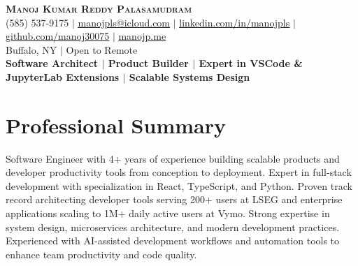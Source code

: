 \documentclass[a4paper,11pt]{article}
\begin{document}
\begin{center}
    \textbf{\Huge \scshape Manoj Kumar Reddy Palasamudram} \\ \vspace{1pt}
    \small (585) 537-9175 $|$ \href{mailto:manojpls@icloud.com}{\underline{manojpls@icloud.com}} $|$ 
    \href{https://linkedin.com/in/manojpls}{\underline{linkedin.com/in/manojpls}} $|$
    \href{https://github.com/manoj30075}{\underline{github.com/manoj30075}} $|$
    \href{https://www.manojp.me}{\underline{manojp.me}} \\
    \small Buffalo, NY $|$ Open to Remote \\
    \small \textbf{Software Architect $|$ Product Builder $|$ Expert in VSCode \& JupyterLab Extensions $|$ Scalable Systems Design}
\end{center}

\section{Professional Summary}
\small{Software Engineer with 4+ years of experience building scalable products and developer productivity tools from conception to deployment. Expert in full-stack development with specialization in React, TypeScript, and Python. Proven track record architecting developer tools serving 200+ users at LSEG and enterprise applications scaling to 1M+ daily active users at Vymo. Strong expertise in system design, microservices architecture, and modern development practices. Experienced with AI-assisted development workflows and automation tools to enhance team productivity and code quality.}

\end{document}
